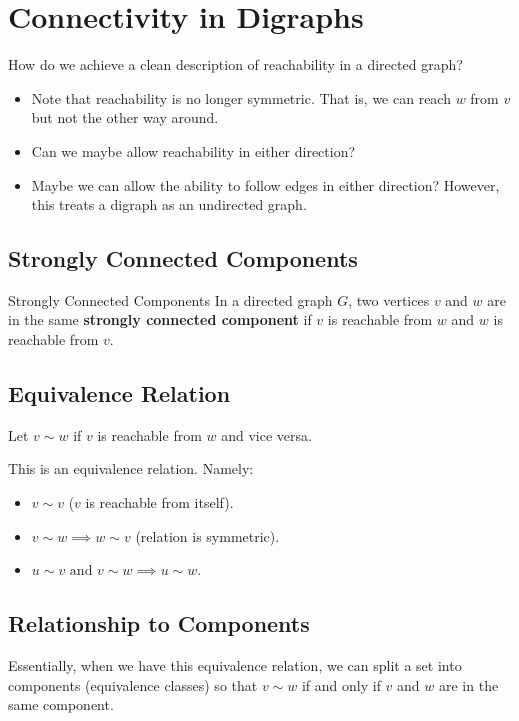 \documentclass[letterpaper]{article}
\begin{document}
\section{Connectivity in Digraphs}
How do we achieve a clean description of reachability in a directed graph? 
\begin{itemize}
    \item Note that reachability is no longer symmetric. That is, we can reach $w$ from $v$ but not the other way around. 
    \item Can we maybe allow reachability in either direction?
    \item Maybe we can allow the ability to follow edges in either direction? However, this treats a digraph as an undirected graph. 
\end{itemize}

\subsection{Strongly Connected Components}
\begin{definition}{Strongly Connected Components}{}
    In a directed graph $G$, two vertices $v$ and $w$ are in the same \textbf{strongly connected component} if $v$ is reachable from $w$ and $w$ is reachable from $v$.
\end{definition}

\subsection{Equivalence Relation}
Let $v \sim w$ if $v$ is reachable from $w$ and vice versa.
\begin{proposition}
    This is an equivalence relation. Namely:
    \begin{itemize}
        \item $v \sim v$ ($v$ is reachable from itself).
        \item $v \sim w \implies w \sim v$ (relation is symmetric).
        \item $u \sim v \text{ and } v \sim w \implies u \sim w$.
    \end{itemize}
\end{proposition}

\subsection{Relationship to Components}
Essentially, when we have this equivalence relation, we can split a set into components (equivalence classes) so that $v \sim w$ if and only if $v$ and $w$ are in the same component.
\end{document}
